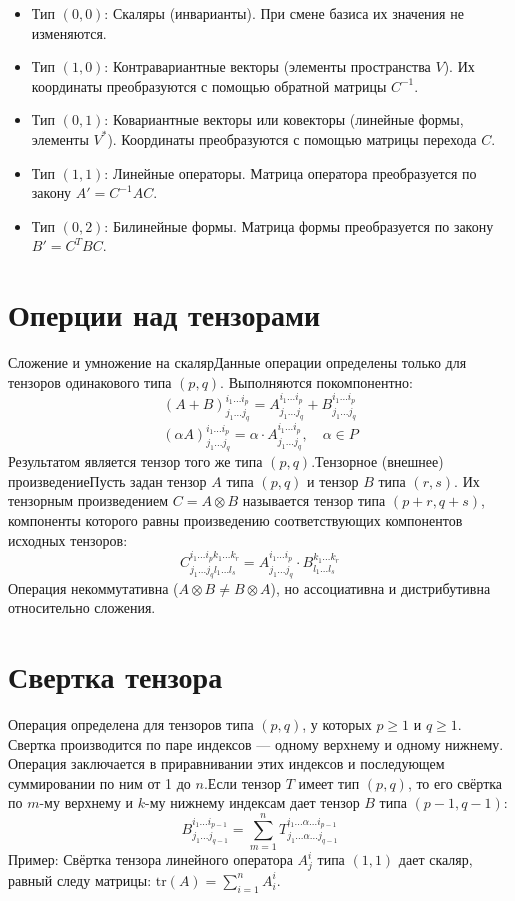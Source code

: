 \documentclass[14pt]{extreport}
\begin{document}
    \begin{itemize}
        \item Тип $(0,0)$: Скаляры (инварианты). При смене базиса их значения не изменяются.
        \item Тип $(1,0)$: Контравариантные векторы (элементы пространства $V$). Их координаты преобразуются с помощью обратной матрицы $C^{-1}$.
        \item Тип $(0,1)$: Ковариантные векторы или ковекторы (линейные формы, элементы $V^*$). Координаты преобразуются с помощью матрицы перехода $C$.
        \item Тип $(1,1)$: Линейные операторы. Матрица оператора преобразуется по закону $A' = C^{-1} A C$.
        \item Тип $(0,2)$: Билинейные формы. Матрица формы преобразуется по закону $B' = C^T B C$.
    \end{itemize}

    \section{Оперции над тензорами}
    Сложение и умножение на скалярДанные операции определены только для тензоров одинакового типа $(p, q)$. Выполняются покомпонентно:$$(A + B)^{i_1 \dots i_p}_{j_1 \dots j_q} = A^{i_1 \dots i_p}_{j_1 \dots j_q} + B^{i_1 \dots i_p}_{j_1 \dots j_q}$$$$(\alpha A)^{i_1 \dots i_p}_{j_1 \dots j_q} = \alpha \cdot A^{i_1 \dots i_p}_{j_1 \dots j_q}, \quad \alpha \in P$$Результатом является тензор того же типа $(p, q)$.Тензорное (внешнее) произведениеПусть задан тензор $A$ типа $(p, q)$ и тензор $B$ типа $(r, s)$. Их тензорным произведением $C = A \otimes B$ называется тензор типа $(p+r, q+s)$, компоненты которого равны произведению соответствующих компонентов исходных тензоров:$$C^{i_1 \dots i_p k_1 \dots k_r}_{j_1 \dots j_q l_1 \dots l_s} = A^{i_1 \dots i_p}_{j_1 \dots j_q} \cdot B^{k_1 \dots k_r}_{l_1 \dots l_s}$$Операция некоммутативна ($A \otimes B \neq B \otimes A$), но ассоциативна и дистрибутивна относительно сложения.

    \section{Свертка тензора}
    Операция определена для тензоров типа $(p, q)$, у которых $p \ge 1$ и $q \ge 1$. Свертка производится по паре индексов — одному верхнему и одному нижнему. Операция заключается в приравнивании этих индексов и последующем суммировании по ним от 1 до $n$.Если тензор $T$ имеет тип $(p, q)$, то его свёртка по $m$-му верхнему и $k$-му нижнему индексам дает тензор $B$ типа $(p-1, q-1)$:$$B^{i_1 \dots i_{p-1}}_{j_1 \dots j_{q-1}} = \sum_{m=1}^n T^{i_1 \dots \alpha \dots i_{p-1}}_{j_1 \dots \alpha \dots j_{q-1}}$$Пример: Свёртка тензора линейного оператора $A^i_j$ типа $(1,1)$ дает скаляр, равный следу матрицы: $\text{tr}(A) = \sum_{i=1}^n A^i_i$.
\end{document}
